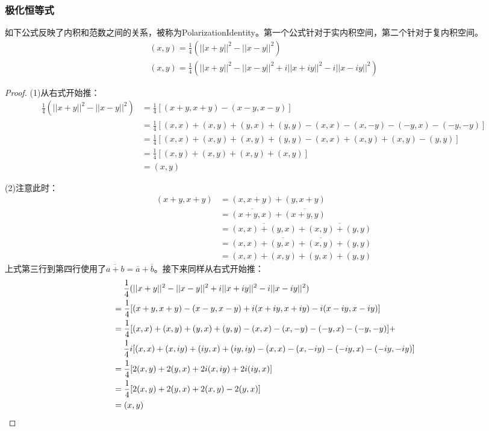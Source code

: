 \subsubsection{极化恒等式}
如下公式反映了内积和范数之间的关系，被称为\gls{PolarizationIdentity}。第一个公式针对于实内积空间，第二个针对于复内积空间。 
\begin{gather*}
	(x,y)=\frac{1}{4}(||x+y||^2-||x-y||^2) \\
	(x,y)=\frac{1}{4}(||x+y||^2-||x-y||^2+i||x+iy||^2-i||x-iy||^2)
\end{gather*}
\begin{proof}
	(1)从右式开始推：
	\begin{align*}
		\frac{1}{4}(||x+y||^2-||x-y||^2)
		&=\frac{1}{4}[(x+y,x+y)-(x-y,x-y)] \\
		&=\frac{1}{4}[(x,x)+(x,y)+(y,x)+(y,y)-(x,x)-(x,-y)-(-y,x)-(-y,-y)] \\
		&=\frac{1}{4}[(x,x)+(x,y)+(x,y)+(y,y)-(x,x)+(x,y)+(x,y)-(y,y)] \\
		&=\frac{1}{4}[(x,y)+(x,y)+(x,y)+(x,y)] \\
		&=(x,y)
	\end{align*}\par
	(2)注意此时：
	\begin{align*}
		(x+y,x+y)
		&=(x,x+y)+(y,x+y) \\
		&=\overline{(x+y,x)}+\overline{(x+y,y)} \\
		&=\overline{(x,x)+(y,x)}+\overline{(x,y)+(y,y)} \\
		&=(x,x)+\overline{(y,x)}+\overline{(x,y)}+(y,y) \\
		&=(x,x)+(x,y)+(y,x)+(y,y)
	\end{align*}
	上式第三行到第四行使用了$\overline{a+b}=\overline{a}+\overline{b}$。接下来同样从右式开始推：
	\begin{align*}
		&\quad\;\frac{1}{4}(||x+y||^2-||x-y||^2+i||x+iy||^2-i||x-iy||^2) \\
		&=\frac{1}{4}[(x+y,x+y)-(x-y,x-y)+i(x+iy,x+iy)-i(x-iy,x-iy)] \\
		&=\frac{1}{4}[(x,x)+(x,y)+(y,x)+(y,y)-(x,x)-(x,-y)-(-y,x)-(-y,-y)]+ \\
		&\quad\;\frac{1}{4}i[(x,x)+(x,iy)+(iy,x)+(iy,iy)-(x,x)-(x,-iy)-(-iy,x)-(-iy,-iy)] \\
		&=\frac{1}{4}[2(x,y)+2(y,x)+2i(x,iy)+2i(iy,x)] \\
		&=\frac{1}{4}[2(x,y)+2(y,x)+2(x,y)-2(y,x)] \\
		&=(x,y)\qedhere
	\end{align*}
\end{proof}
